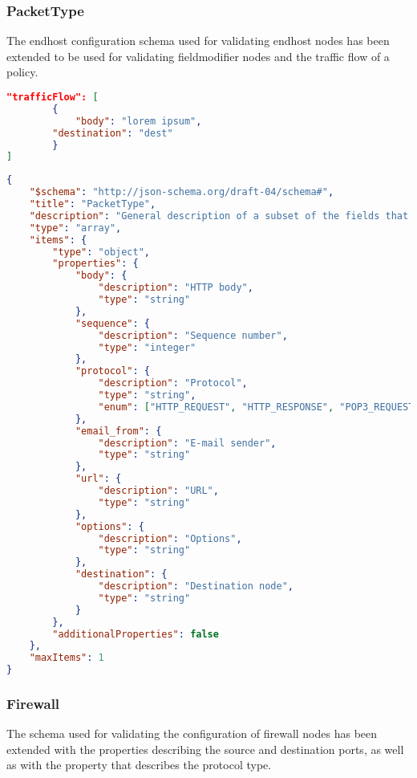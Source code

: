 \subsubsection*{PacketType}
The endhost configuration schema used for validating endhost nodes has been extended to be used for validating fieldmodifier nodes and the traffic flow of a policy.

\begin{lstlisting}[language=JSON, caption=PacketType Example]
"trafficFlow": [
        {
          	"body": "lorem ipsum",
		"destination": "dest"
        }
]
\end{lstlisting}

\begin{lstlisting}[language=JSON, caption=PacketType schema]
{
    "$schema": "http://json-schema.org/draft-04/schema#",
    "title": "PacketType",
    "description": "General description of a subset of the fields that characterize a packet or a traffic flow.",
    "type": "array",
    "items": {
        "type": "object",
        "properties": {
            "body": {
                "description": "HTTP body",
                "type": "string"
            },
            "sequence": {
                "description": "Sequence number",
                "type": "integer"
            },
            "protocol": {
                "description": "Protocol",
                "type": "string",
                "enum": ["HTTP_REQUEST", "HTTP_RESPONSE", "POP3_REQUEST", "POP3_RESPONSE"]
            },
            "email_from": {
                "description": "E-mail sender",
                "type": "string"
            },
            "url": {
                "description": "URL",
                "type": "string"
            },
            "options": {
                "description": "Options",
                "type": "string"
            },
            "destination": {
                "description": "Destination node",
                "type": "string"
            }
        },
        "additionalProperties": false
    },
    "maxItems": 1
}
\end{lstlisting}

\subsubsection*{Firewall}
The schema used for validating the configuration of firewall nodes has been extended with the properties describing the source and destination ports, as well as with the property that describes the protocol type.

